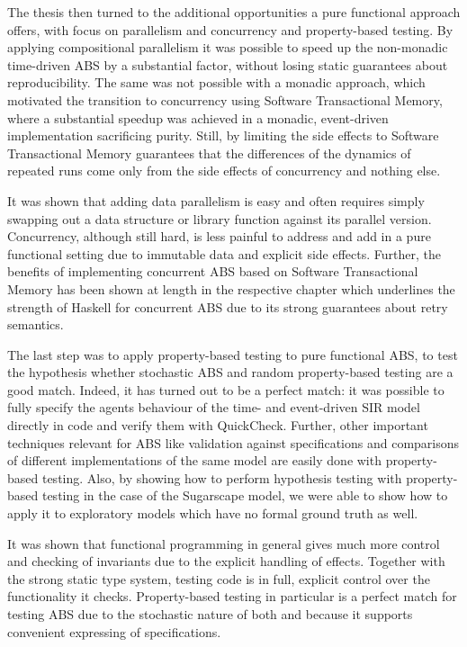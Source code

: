 \medskip

The thesis then turned to the additional opportunities a pure functional approach offers, with focus on parallelism and concurrency and property-based testing. By applying compositional parallelism it was possible to speed up the non-monadic time-driven ABS by a substantial factor, without losing static guarantees about reproducibility. The same was not possible with a monadic approach, which motivated the transition to concurrency using Software Transactional Memory, where a substantial speedup was achieved in a monadic, event-driven implementation sacrificing purity. Still, by limiting the side effects to Software Transactional Memory guarantees that the differences of the dynamics of repeated runs come only from the side effects of concurrency and nothing else. 

It was shown that adding data parallelism is easy and often requires simply swapping out a data structure or library function against its parallel version. Concurrency, although still hard, is less painful to address and add in a pure functional setting due to immutable data and explicit side effects. Further, the benefits of implementing concurrent ABS based on Software Transactional Memory has been shown at length in the respective chapter which underlines the strength of Haskell for concurrent ABS due to its strong guarantees about retry semantics.

\medskip

The last step was to apply property-based testing to pure functional ABS, to test the hypothesis whether stochastic ABS and random property-based testing are a good match. Indeed, it has turned out to be a perfect match: it was possible to fully specify the agents behaviour of the time- and event-driven SIR model directly in code and verify them with QuickCheck. Further, other important techniques relevant for ABS like validation against specifications and comparisons of different implementations of the same model are easily done with property-based testing. Also, by showing how to perform hypothesis testing with property-based testing in the case of the Sugarscape model, we were able to show how to apply it to exploratory models which have no formal ground truth as well.

It was shown that functional programming in general gives much more control and checking of invariants due to the explicit handling of effects. Together with the strong static type system, testing code is in full, explicit control over the functionality it checks. Property-based testing in particular is a perfect match for testing ABS due to the stochastic nature of both and because it supports convenient expressing of specifications. %

